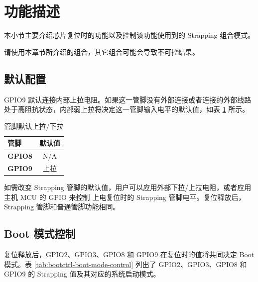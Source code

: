 \documentclass[main\_\_CN.tex]{subfiles}
\begin{document}
\section{功能描述}

本小节主要介绍芯片复位时的功能以及控制该功能使用到的 Strapping 组合模式。

\begin{importantlisting}
请使用本章节所介绍的组合，其它组合可能会导致不可控结果。
\end{importantlisting}

\subsection{默认配置}

GPIO9 默认连接内部上拉电阻。如果这一管脚没有外部连接或者连接的外部线路处于高阻抗状态，内部弱上拉将决定这一管脚输入电平的默认值，如表 \ref{tab:bootctrl-default-config-strapping-pins} 所示。

\begin{longtable}[c]{|p{1.5cm}|c|}
\caption{管脚默认上拉/下拉}
\label{tab:bootctrl-default-config-strapping-pins} \\
    \hline
    \rowcolor{lightgray}
  \textbf{管脚} & \textbf{默认值} \\ \hline
  \textbf{GPIO8} & N/A \\ \hline
  \textbf{GPIO9} & 上拉 \\ \hline
\end{longtable}

如需改变 Strapping 管脚的默认值，用户可以应用外部下拉/上拉电阻，或者应用主机 MCU 的 GPIO 来控制 \chipname{} 上电复位时的 Strapping 管脚电平。复位释放后，Strapping 管脚和普通管脚功能相同。

\subsection{Boot 模式控制}\label{sec:boot-mode-control}
复位释放后，GPIO2、GPIO3、GPIO8 和 GPIO9 在复位时的值将共同决定 Boot 模式。表 \ref{tab:bootctrl-boot-mode-control} 列出了 GPIO2、GPIO3、GPIO8 和 GPIO9 的 Strapping 值及其对应的系统启动模式。
\end{document}
